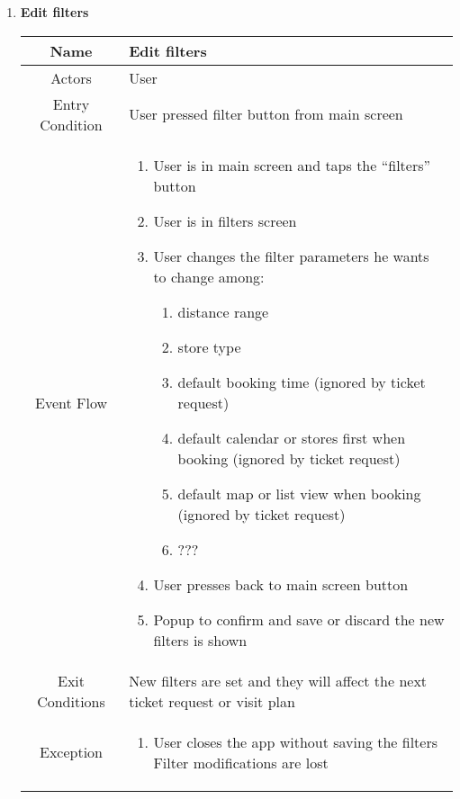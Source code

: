 \begin{enumerate}
\begin{table}[H]
{\begin{tabular}{|c|p{14cm}|}
\begin{enumerate}
			\end{enumerate}\\
			
			\hline
		\end{tabular}
	}
\end{table}

\item \textbf{Edit filters}

\begin{table}[H]
	{
		\begin{tabular}{|c|p{14cm}|}
			\hline
			Name & Edit filters\\
			\hline
			Actors & User\\
			\hline
			Entry Condition & User pressed filter button from main screen\\
			\hline
			
			Event Flow & \begin{enumerate}
				\item User is in main screen and taps the “filters” button
				\item User is in filters screen
				\item User changes the filter parameters he wants to change among:
				\begin{enumerate}
					\item distance range
					\item store type
					\item default booking time (ignored by ticket request)
					\item default calendar or stores first when booking (ignored by ticket request)
					\item default map or list view when booking (ignored by ticket request)
					\item ???
				\end{enumerate}
				
				\item User presses back to main screen button
				\item Popup to confirm and save or discard the new filters is shown 
				
			\end{enumerate}\\
			
			\hline
			Exit Conditions & New filters are set and they will affect the next ticket request or visit plan\\
			\hline
			
			Exception & \begin{enumerate}
				\item User closes the app without saving the filters\newline
				Filter modifications are lost
				
			\end{enumerate}\\
			
			\hline
		\end{tabular}
	}
\end{table}


\end{enumerate}
